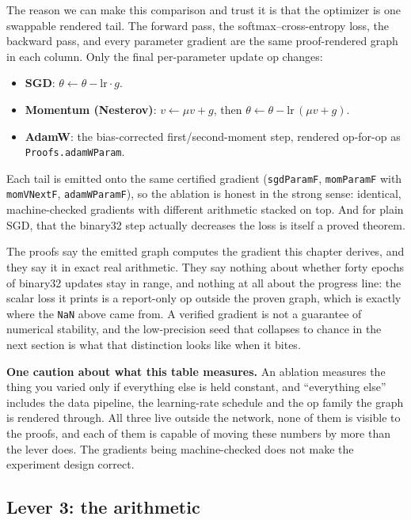 The reason we can make this comparison and trust it is that the
optimizer is one swappable rendered tail. The forward pass, the
softmax--cross-entropy loss, the backward pass, and every parameter
gradient are the same proof-rendered graph in each column. Only the
final per-parameter update op changes:

\begin{itemize}
  \item \textbf{SGD}: $\theta \leftarrow \theta - \mathrm{lr}\cdot g$.
  \item \textbf{Momentum (Nesterov)}: $v \leftarrow \mu v + g$, then
    $\theta \leftarrow \theta - \mathrm{lr}\,(\mu v + g)$.
  \item \textbf{AdamW}: the bias-corrected first/second-moment step,
    rendered op-for-op as \texttt{Proofs.adamWParam}.
\end{itemize}

\noindent Each tail is emitted onto the same certified gradient
(\texttt{sgdParamF}, \texttt{momParamF} with \texttt{momVNextF}, \texttt{adamWParamF}),
so the ablation is honest in the strong sense: identical, machine-checked
gradients with different arithmetic stacked on top. And for plain
SGD, that the binary32 step actually decreases the loss is itself a
proved theorem.

\noindent The proofs say the emitted graph computes the gradient this
chapter derives, and they say it in exact real arithmetic. They say
nothing about whether forty epochs of binary32 updates stay in range,
and nothing at all about the progress line: the scalar loss it prints is
a report-only op outside the proven graph, which is exactly where the
\texttt{NaN} above came from. A verified gradient is not a guarantee of
numerical stability, and the low-precision seed that collapses to chance
in the next section is what that distinction looks like when it bites.

\medskip\noindent\textbf{One caution about what this table measures.} An
ablation measures the thing you varied only if everything else is held
constant, and ``everything else'' includes the data pipeline, the
learning-rate schedule and the op family the graph is rendered through.
All three live outside the network, none of them is visible to the
proofs, and each of them is capable of moving these numbers by more than
the lever does. The gradients being machine-checked does not make the
experiment design correct.

\subsection*{Lever 3: the arithmetic}

